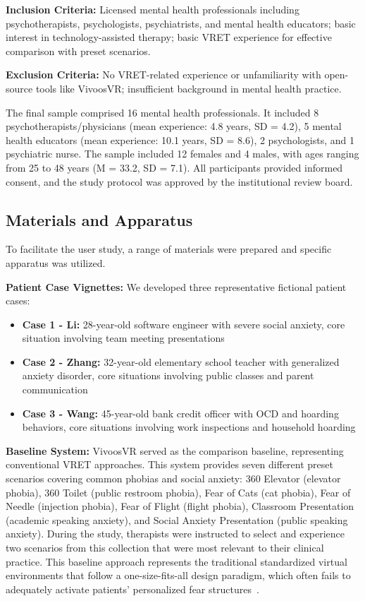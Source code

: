 \documentclass[]{interact}
\begin{document}
\textbf{Inclusion Criteria:} Licensed mental health professionals including psychotherapists, psychologists, psychiatrists, and mental health educators; basic interest in technology-assisted therapy; basic VRET experience for effective comparison with preset scenarios.

\textbf{Exclusion Criteria:} No VRET-related experience or unfamiliarity with open-source tools like VivoosVR; insufficient background in mental health practice.

The final sample comprised 16 mental health professionals. It included 8 psychotherapists/physicians (mean experience: 4.8 years, SD = 4.2), 5 mental health educators (mean experience: 10.1 years, SD = 8.6), 2 psychologists, and 1 psychiatric nurse. The sample included 12 females and 4 males, with ages ranging from 25 to 48 years (M = 33.2, SD = 7.1). All participants provided informed consent, and the study protocol was approved by the institutional review board.

\subsection{Materials and Apparatus}

To facilitate the user study, a range of materials were prepared and specific apparatus was utilized.

\textbf{Patient Case Vignettes:} We developed three representative fictional patient cases:
\begin{itemize}
    \item \textbf{Case 1 - Li:} 28-year-old software engineer with severe social anxiety, core situation involving team meeting presentations
    \item \textbf{Case 2 - Zhang:} 32-year-old elementary school teacher with generalized anxiety disorder, core situations involving public classes and parent communication
    \item \textbf{Case 3 - Wang:} 45-year-old bank credit officer with OCD and hoarding behaviors, core situations involving work inspections and household hoarding
\end{itemize}

\textbf{Baseline System:} VivoosVR served as the comparison baseline, representing conventional VRET approaches. This system provides seven different preset scenarios covering common phobias and social anxiety: 360 Elevator (elevator phobia), 360 Toilet (public restroom phobia), Fear of Cats (cat phobia), Fear of Needle (injection phobia), Fear of Flight (flight phobia), Classroom Presentation (academic speaking anxiety), and Social Anxiety Presentation (public speaking anxiety). During the study, therapists were instructed to select and experience two scenarios from this collection that were most relevant to their clinical practice. This baseline approach represents the traditional standardized virtual environments that follow a one-size-fits-all design paradigm, which often fails to adequately activate patients' personalized fear structures~\cite{li2022application}. 
\end{document}
